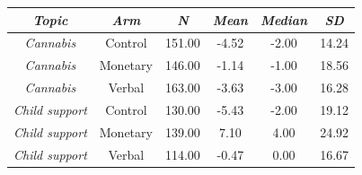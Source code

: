 \begin{tabular}{c c c c c c}
      \hline
      \textit{Topic} & \textit{Arm} & \textit{N} & \textit{Mean} & \textit{Median} & \textit{SD} \\
      \hline
      \textit{Cannabis} & Control & 151.00 & -4.52 & -2.00 & 14.24 \\
      \textit{Cannabis} & Monetary & 146.00 & -1.14 & -1.00 & 18.56 \\
      \textit{Cannabis} & Verbal & 163.00 & -3.63 & -3.00 & 16.28 \\
      \textit{Child support} & Control & 130.00 & -5.43 & -2.00 & 19.12 \\
      \textit{Child support} & Monetary & 139.00 & 7.10 & 4.00 & 24.92 \\
      \textit{Child support} & Verbal & 114.00 & -0.47 & 0.00 & 16.67 \\
      \hline
    \end{tabular}